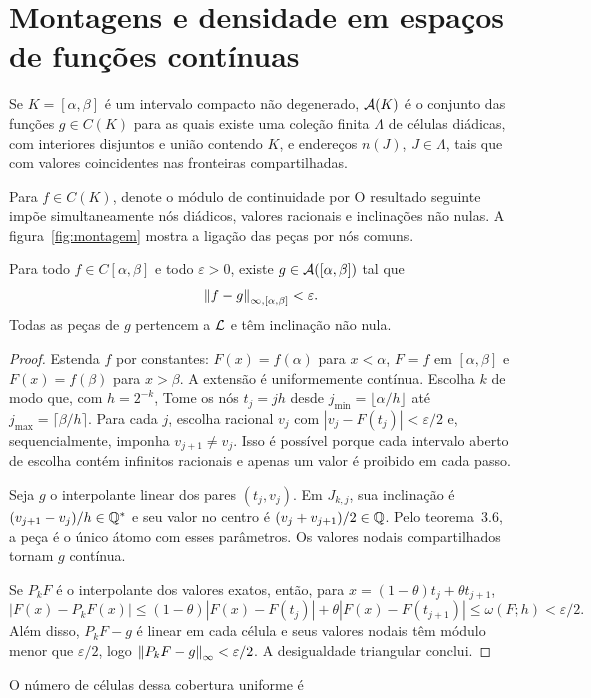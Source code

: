 \section{Montagens e densidade em espaços de funções contínuas}
\begin{definicao}
Se $K=[\alpha,\beta]$ é um intervalo compacto não degenerado, $\mathcal A(K)$ é o conjunto das funções $g\in C(K)$ para as quais existe uma coleção finita $\Lambda$ de células diádicas, com interiores disjuntos e união contendo $K$, e endereços $n(J)$, $J\in\Lambda$, tais que
com valores coincidentes nas fronteiras compartilhadas.
\end{definicao}
Para $f\in C(K)$, denote o módulo de continuidade por
O resultado seguinte impõe simultaneamente nós diádicos, valores racionais e inclinações não nulas. A figura~\ref{fig:montagem} mostra a ligação das peças por nós comuns.

\begin{teorema}
Para todo $f\in C[\alpha,\beta]$ e todo $\varepsilon>0$, existe $g\in\mathcal A([\alpha,\beta])$ tal que
\[
\left\|f-g\right\|_{\infty,[\alpha,\beta]}<\varepsilon.
\]
Todas as peças de $g$ pertencem a $\mathcal L$ e têm inclinação não nula.
\end{teorema}
\begin{proof}
Estenda $f$ por constantes: $F(x)=f(\alpha)$ para $x<\alpha$, $F=f$ em $[\alpha,\beta]$ e $F(x)=f(\beta)$ para $x>\beta$. A extensão é uniformemente contínua. Escolha $k$ de modo que, com $h=2^{-k}$,
Tome os nós $t_j=jh$ desde $j_{\min}=\lfloor\alpha/h\rfloor$ até $j_{\max}=\lceil\beta/h\rceil$. Para cada $j$, escolha racional $v_j$ com $|v_j-F(t_j)|<\varepsilon/2$ e, sequencialmente, imponha $v_{j+1}\ne v_j$. Isso é possível porque cada intervalo aberto de escolha contém infinitos racionais e apenas um valor é proibido em cada passo.

Seja $g$ o interpolante linear dos pares $(t_j,v_j)$. Em $J_{k,j}$, sua inclinação é $(v_{j+1}-v_j)/h\in\mathbb Q^*$ e seu valor no centro é $(v_j+v_{j+1})/2\in\mathbb Q$. Pelo teorema~3.6, a peça é o único átomo com esses parâmetros. Os valores nodais compartilhados tornam $g$ contínua.

Se $P_kF$ é o interpolante dos valores exatos, então, para $x=(1-\theta)t_j+\theta t_{j+1}$,
\[
|F(x)-P_kF(x)|\le(1-\theta)|F(x)-F(t_j)|+\theta|F(x)-F(t_{j+1})|
\le\omega(F;h)<\varepsilon/2.
\]
Além disso, $P_kF-g$ é linear em cada célula e seus valores nodais têm módulo menor que $\varepsilon/2$, logo $\left\|P_kF-g\right\|_{\infty}<\varepsilon/2$. A desigualdade triangular conclui.
\end{proof}
O número de células dessa cobertura uniforme é

